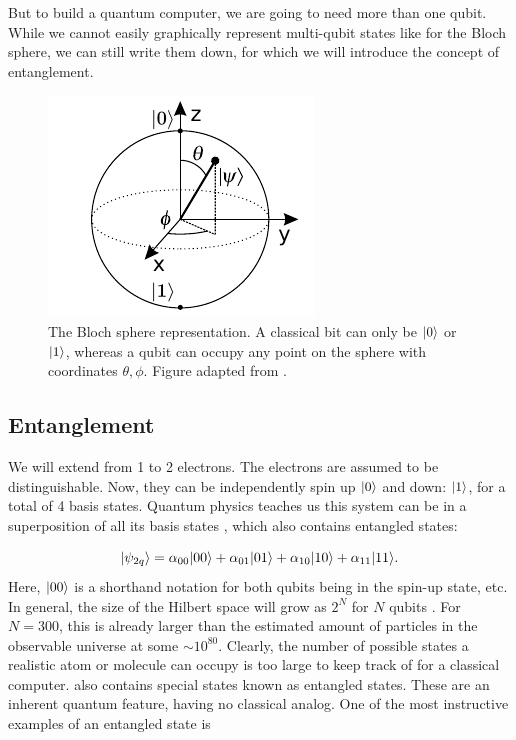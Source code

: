 But to build a quantum computer, we are going to need more than one qubit. 
While we cannot easily graphically represent multi-qubit states like for the Bloch sphere, we can still write them down, for which we will introduce the concept of entanglement.

\begin{figure}
	\centering
	\includegraphics[width=.34\linewidth]{figures/BlochSphereCropped.pdf}
	\caption{The Bloch sphere representation. A classical bit can only be $\lvert0\rangle$ or $\lvert1\rangle$, whereas a qubit can occupy any point on the sphere with coordinates $\theta, \phi$. Figure adapted from \cite{Jones2012}.}
	\label{fig:BlochSphere}
\end{figure}

\subsection{Entanglement}\label{sub:Entanglement}

We will extend from 1 to 2 electrons. 
The electrons are assumed to be distinguishable. 
Now, they can be independently spin up $\lvert0\rangle$ and down: $\lvert1\rangle$, for a total of 4 basis states.
Quantum physics teaches us this system can be in a superposition of all its basis states \cite{Nielsen2011}, which also contains entangled states:

\begin{equation}\label{eq:TwoQubits}
	\lvert\psi_{2q}\rangle = 
	\alpha_{00} \lvert00\rangle + \alpha_{01} \lvert01\rangle + \alpha_{10} \lvert10\rangle + \alpha_{11} \lvert11\rangle.
\end{equation}
Here, $\lvert00\rangle$ is a shorthand notation for both qubits being in the spin-up state, etc.
In general, the size of the Hilbert space will grow as $2^N$ for $N$ qubits \cite{Nielsen2011,Henriet2020}. 
For $N=300$, this is already larger than the estimated amount of particles in the observable universe at some $\sim 10^{80}$. 
Clearly, the number of possible states a realistic atom or molecule can occupy is too large to keep track of for a classical computer.
 also contains special states known as entangled states. 
These are an inherent quantum feature, having no classical analog.
One of the most instructive examples of an entangled state is 

